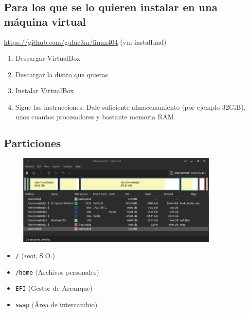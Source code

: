 \documentclass[aspectratio=43]{beamer}
\begin{document}
    \subsection{Para los que se lo quieren instalar en una máquina virtual}
    \begin{frame}{\secname}{\subsecname}
        \url{https://github.com/guluc3m/linux404} (vm-install.md)
        \begin{enumerate}
            \item Descargar VirtualBox
            \item Descargar la distro que quieras
            \item Instalar VirtualBox
            \item Sigue las instrucciones. Dale suficiente almacenamiento
                (por ejemplo 32GiB), unos cuantos procesadores y bastante
                memoria RAM.
        \end{enumerate}
    \end{frame}

    \subsection{Particiones}
    \begin{frame}[fragile]{\secname}{\subsecname}
        \begin{figure}
            \centering
            \includegraphics[width=0.9\textwidth]{img/partitions.png}
        \end{figure}
        \begin{itemize}
            \item \verb!/! (\textit{root}, S.O.)
            \item \verb!/home! (Archivos personales)
            \item \verb!EFI! (Gestor de Arranque)
            \item \verb!swap! (Área de intercambio)
        \end{itemize}
    \end{frame}
\end{document}
